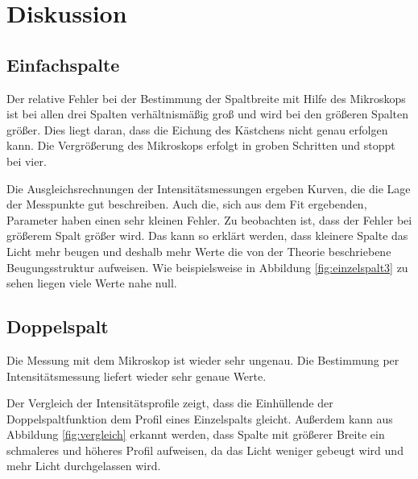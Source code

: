 \section{Diskussion}
\label{sec:Diskussion}

\subsection{Einfachspalte}
Der relative Fehler bei der Bestimmung der Spaltbreite mit Hilfe
des Mikroskops ist bei allen drei Spalten verhältnismäßig groß und
wird bei den größeren Spalten größer. Dies liegt daran, dass die Eichung
des Kästchens nicht genau erfolgen kann. Die Vergrößerung des Mikroskops
erfolgt in groben Schritten und stoppt bei vier.

Die Ausgleichsrechnungen der Intensitätsmessungen ergeben Kurven, die die Lage der Messpunkte gut beschreiben.
Auch die, sich aus dem Fit ergebenden, Parameter haben einen sehr kleinen Fehler.
Zu beobachten ist, dass der Fehler bei größerem Spalt größer wird. Das kann so erklärt
werden, dass kleinere Spalte das Licht mehr beugen und deshalb mehr Werte
die von der Theorie beschriebene Beugungsstruktur aufweisen. Wie beispielsweise in Abbildung
\ref{fig:einzelspalt3} zu sehen liegen viele Werte nahe null.

\subsection{Doppelspalt}

Die Messung mit dem Mikroskop ist wieder sehr ungenau.
Die Bestimmung per Intensitätsmessung liefert wieder sehr genaue
Werte.

Der Vergleich der Intensitätsprofile zeigt, dass die Einhüllende der
Doppelspaltfunktion dem Profil eines Einzelspalts gleicht. Außerdem kann aus
Abbildung \ref{fig:vergleich} erkannt werden, dass Spalte mit größerer Breite ein schmaleres
und höheres Profil aufweisen, da das Licht weniger gebeugt wird
und mehr Licht durchgelassen wird.
